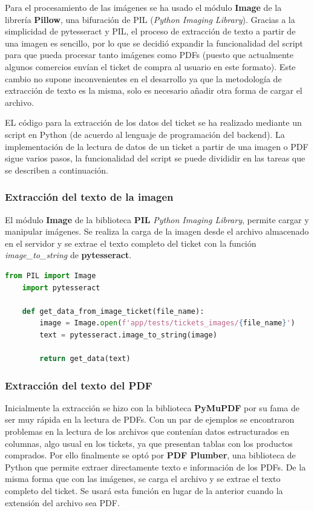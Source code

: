 Para el procesamiento de las imágenes se ha usado el módulo \textbf{Image} de la librería \textbf{Pillow}, una bifuración de PIL (\textit{Python Imaging Library}). Gracias a la simplicidad de pytesseract y PIL, el proceso de extracción de texto a partir de una imagen es sencillo, por lo que se decidió expandir la funcionalidad del script para que pueda procesar tanto imágenes como PDFs (puesto que actualmente algunos comercios envían el ticket de compra al usuario en este formato). Este cambio no supone inconvenientes en el desarrollo ya que la metodología de extracción de texto es la misma, solo es necesario añadir otra forma de cargar el archivo.

EL código para la extracción de los datos del ticket se ha realizado mediante un script en Python (de acuerdo al lenguaje de programación del backend). La implementación de la lectura de datos de un ticket a partir de una imagen o PDF sigue varios pasos, la funcionalidad del script se puede divididir en las tareas que se describen a continuación.


\subsubsection{Extracción del texto de la imagen}
El módulo \textbf{Image} de la biblioteca \textbf{PIL} \textit{Python Imaging Library}, permite cargar y manipular imágenes. Se realiza la carga de la imagen desde el archivo almacenado en el servidor y se extrae el texto completo del ticket con la función \textit{image\_to\_string} de \textbf{pytesseract}.
    
\begin{lstlisting}[language=Python, caption=Extracción de texto de una imagen]
    from PIL import Image
    import pytesseract

    def get_data_from_image_ticket(file_name):
        image = Image.open(f'app/tests/tickets_images/{file_name}')
        text = pytesseract.image_to_string(image)

        return get_data(text)
\end{lstlisting}

\subsubsection{Extracción del texto del PDF}
Inicialmente la extracción se hizo con la biblioteca \textbf{PyMuPDF} por su fama de ser muy rápida en la lectura de PDFs. Con un par de ejemplos se encontraron problemas en la lectura de los archivos que contenían datos estructurados en columnas, algo usual en los tickets, ya que presentan tablas con los productos comprados. Por ello finalmente se optó por \textbf{PDF Plumber}, una biblioteca de Python que permite extraer directamente texto e información de los PDFs. De la misma forma que con las imágenes, se carga el archivo y se extrae el texto completo del ticket. Se usará esta función en lugar de la anterior cuando la extensión del archivo sea PDF.

